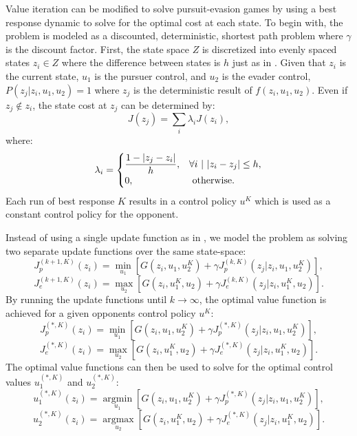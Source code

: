 Value iteration can be modified to solve pursuit-evasion games by using a best response dynamic to solve for the optimal cost at each state. To begin with, the problem is modeled as a discounted, deterministic, shortest path problem where $\gamma$ is the discount factor. First, the state space $Z$ is discretized into evenly spaced states $z_i \in Z$ where the difference between states is $h$ just as in \cite{bardi2}. Given that $z_i$ is the current state, $u_1$ is the pursuer control, and $u_2$ is the evader control, $P(z_j|z_i,u_1,u_2) = 1$ where $z_j$ is the deterministic result of $f(z_i,u_1,u_2)$. Even if $z_j \notin z_i$, the state cost at $z_j$ can be determined by:
\begin{equation}\label{concomb}
J(z_j)  =  \sum_i\lambda_iJ(z_i),
\end{equation}
where:
\begin{equation}\label{lamb}
\lambda_i = 
\begin{cases}
\dfrac{1-|z_j-z_i|}{h}, & \forall i \textnormal{ }|\textnormal{ } |z_i-z_j|\leq h,\\
0, & \textnormal{ otherwise}.
\end{cases}
\end{equation} 
Each run of best response $K$ results in a control policy $u^K$ which is used as a constant control policy for the opponent. 

Instead of using a single update function as in , we model the problem as solving two separate update functions over the same state-space:
\begin{equation}\label{pbell}
J_p^{(k+1,K)}(z_i)= \underset{u_1 }{\operatorname{min }}[G(z_i,u_1,u_2^K)+\gamma J_p^{(k,K)}(z_j|z_i,u_1,u_2^K)],
\end{equation}
\begin{equation}\label{ebell}
J_e^{(k+1,K)}(z_i)= \underset{u_2 }{\operatorname{max }}[G(z_i,u_1^K,u_2)+\gamma J_e^{(k,K)}(z_j|z_i,u_1^K,u_2)].
\end{equation} 
By running the update functions until $k \rightarrow \infty$, the optimal value function is achieved for a given opponents control policy $u^K$:
\begin{equation}\label{popt}
J_p^{(*,K)}(z_i)= \underset{u_1 }{\operatorname{min }}[G(z_i,u_1,u_2^K)+\gamma J_p^{(*,K)}(z_j|z_i,u_1,u_2^K)],
\end{equation}
\begin{equation}\label{eopt}
J_e^{(*,K)}(z_i)= \underset{u_2 }{\operatorname{max }}[G(z_i,u_1^K,u_2)+\gamma J_e^{(*,K)}(z_j|z_i,u_1^K,u_2)].
\end{equation}
The optimal value functions can then be used to solve for the optimal control values $u_1^{(*,K)}$ and $u_2^{(*,K)}$:
\begin{equation}\label{pcont}
u_1^{(*,K)}(z_i)= \underset{u_1 }{\operatorname{arg min }}[G(z_i,u_1,u_2^K)+\gamma J_p^{(*,K)}(z_j|z_i,u_1,u_2^K)],
\end{equation}
\begin{equation}\label{econt}
u_2^{(*,K)}(z_i)= \underset{u_2 }{\operatorname{arg max }}[G(z_i,u_1^K,u_2)+\gamma J_e^{(*,K)}(z_j|z_i,u_1^K,u_2)].
\end{equation}  

